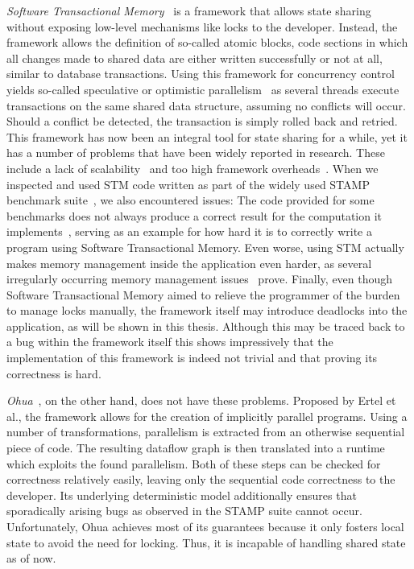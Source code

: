 \emph{Software Transactional Memory}~\cite{shavit1997software} is a framework that allows state sharing without exposing low-level mechanisms like locks to the developer.
Instead, the framework allows the definition of so-called atomic blocks, code sections in which all changes made to shared data are either written successfully or not at all, similar to database transactions.
Using this framework for concurrency control yields so-called speculative or optimistic parallelism~\cite{kulkarni2007optimistic} as several threads execute transactions on the same shared data structure, assuming no conflicts will occur.
Should a conflict be detected, the transaction is simply rolled back and retried.
This framework has now been an integral tool for state sharing for a while, yet it has a number of problems that have been widely reported in research.
These include a lack of scalability~\cite{perfumo2008limits} and too high framework overheads~\cite{cascaval2008software}.
When we inspected and used STM code written as part of the widely used STAMP benchmark suite~\cite{minh2008stamp}, we also encountered issues:
The code provided for some benchmarks does not always produce a correct result for the computation it implements~\cite{wittwer2020labyrinth}, serving as an example for how hard it is to correctly write a program using Software Transactional Memory.
Even worse, using STM actually makes memory management inside the application even harder, as several irregularly occurring memory management issues~\cite{wittwer2020segmentation} prove.
Finally, even though Software Transactional Memory aimed to relieve the programmer of the burden to manage locks manually, the framework itself may introduce deadlocks into the application, as will be shown in this thesis.
Although this may be traced back to a bug within the framework itself this shows impressively that the implementation of this framework is indeed not trivial and that proving its correctness is hard.

\emph{Ohua}~\cite{ertel2015ohua}, on the other hand, does not have these problems.
Proposed by Ertel et al., the framework allows for the creation of implicitly parallel programs.
Using a number of transformations, parallelism is extracted from an otherwise sequential piece of code.
The resulting dataflow graph is then translated into a runtime which exploits the found parallelism.
Both of these steps can be checked for correctness relatively easily, leaving only the sequential code correctness to the developer.
Its underlying deterministic model additionally ensures that sporadically arising bugs as observed in the STAMP suite cannot occur.
Unfortunately, Ohua achieves most of its guarantees because it only fosters local state to avoid the need for locking.
Thus, it is incapable of handling shared state as of now.

